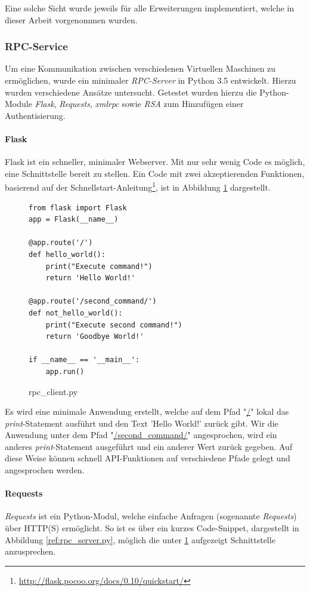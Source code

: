 Eine solche Sicht wurde jeweils für alle Erweiterungen implementiert, welche in dieser Arbeit vorgenommen wurden.

\subsubsection{RPC-Service}\label{ref:XMLRPC}
Um eine Kommunikation zwischen verschiedenen Virtuellen Maschinen zu ermöglichen, wurde ein minimaler \textit{RPC-Server} in Python 3.5 entwickelt. Hierzu wurden verschiedene Ansätze untersucht. Getestet wurden hierzu die Python-Module \textit{Flask}, \textit{Requests}, \textit{xmlrpc} sowie \textit{RSA} zum Hinzufügen einer Authentisierung.

\paragraph{Flask}\label{ref:flask}
Flask ist ein schneller, minimaler Webserver. Mit nur sehr wenig Code es möglich, eine Schnittstelle bereit zu stellen. Ein Code mit zwei akzeptierenden Funktionen, basierend auf der Schnellstart-Anleitung\footnote{\url{http://flask.pocoo.org/docs/0.10/quickstart/}}, ist in Abbildung \ref{ref:rpc_client.py} dargestellt.
\begin{figure}
\begin{lstlisting}
from flask import Flask
app = Flask(__name__)

@app.route('/')
def hello_world():
	print("Execute command!")
    return 'Hello World!'
    
@app.route('/second_command/')
def not_hello_world():
	print("Execute second command!")
    return 'Goodbye World!'

if __name__ == '__main__':
    app.run()
\end{lstlisting}
\label{ref:rpc_client.py}
\caption{rpc\_client.py}
\end{figure}

Es wird eine minimale Anwendung erstellt, welche auf dem Pfad "\url{/}" lokal das \textit{print}-Statement ausführt und den Text 'Hello World!' zurück gibt. 
Wir die Anwendung unter dem Pfad "\url{/second_command/}" angesprochen, wird ein anderes \textit{print}-Statement ausgeführt und ein anderer Wert zurück gegeben. Auf diese Weise können schnell API-Funktionen auf verschiedene Pfade gelegt und angesprochen werden.

\paragraph{Requests}
\textit{Requests} ist ein Python-Modul, welche einfache Anfragen (sogenannte \textit{Requests}) über HTTP(S) ermöglicht. So ist es über ein kurzes Code-Snippet, dargestellt in Abbildung \ref{ref:rpc_server.py}, möglich die unter \ref{ref:rpc_client.py} aufgezeigt Schnittstelle anzusprechen.

